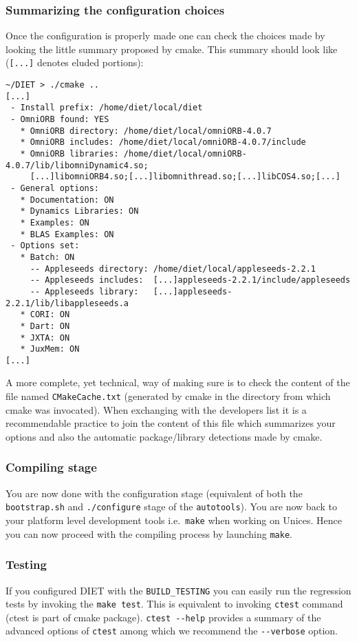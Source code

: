 \subsubsection{Summarizing the configuration choices}
Once the configuration is properly made one can check the choices made
by looking the little summary proposed by cmake.
This summary should look like (\verb+[...]+ denotes eluded portions):
{\footnotesize
\begin{verbatim}
~/DIET > ./cmake ..
[...]
 - Install prefix: /home/diet/local/diet
 - OmniORB found: YES
   * OmniORB directory: /home/diet/local/omniORB-4.0.7
   * OmniORB includes: /home/diet/local/omniORB-4.0.7/include
   * OmniORB libraries: /home/diet/local/omniORB-4.0.7/lib/libomniDynamic4.so;
     [...]libomniORB4.so;[...]libomnithread.so;[...]libCOS4.so;[...]
 - General options:
   * Documentation: ON
   * Dynamics Libraries: ON
   * Examples: ON
   * BLAS Examples: ON
 - Options set:
   * Batch: ON
     -- Appleseeds directory: /home/diet/local/appleseeds-2.2.1
     -- Appleseeds includes:  [...]appleseeds-2.2.1/include/appleseeds
     -- Appleseeds library:   [...]appleseeds-2.2.1/lib/libappleseeds.a
   * CORI: ON
   * Dart: ON
   * JXTA: ON
   * JuxMem: ON
[...]
\end{verbatim}
}
A more complete, yet technical, way of making sure is to check the content
of the file named \verb+CMakeCache.txt+ (generated by cmake in the
directory from which cmake was invocated).
When exchanging with the developers list it is a recommendable practice
to join the content of this file which summarizes your options and also
the automatic package/library detections made by cmake.

\subsubsection{Compiling stage}
You are now done with the configuration stage (equivalent of both the
\verb+bootstrap.sh+ and \verb+./configure+ stage of the \verb+autotools+).
You are now back to your platform level development tools i.e.~\verb+make+
when working on Unices.
Hence you can now proceed with the compiling process by launching \verb+make+.

\subsubsection{Testing}
If you configured DIET with the \verb+BUILD_TESTING+ you can easily run
the regression tests by invoking the \verb+make test+.
This is equivalent to invoking \verb+ctest+ command (ctest is part of cmake
package). \verb+ctest --help+ provides a summary of the advanced options
of \verb+ctest+ among which we recommend the \verb+--verbose+ option.

